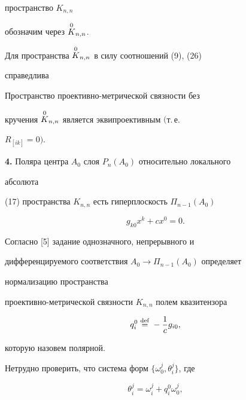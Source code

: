 пространство $K_{n,n}$ 


обозначим через $\overset{0}{K}{}_{n,n}$. 


 


Для пространства $\overset{0}{K}{}_{n,n}$ в силу соотношений (9), (26) 


справедлива 


 


\begin{thm} 


Пространство проективно-метрической связности без 


кручения $\overset{0}{K}{}_{n,n}$ является эквипроективным $($т.\,е. 


$R_{[ik]}=0)$. 


\end{thm} 


 


 


{\bf 4.} Поляра центра $A_0$ слоя $P_n(A_0)$ относительно локального 


абсолюта 


(17) пространства $K_{n,n}$ есть гиперплоскость $\Pi_{n-1}(A_0)$ 


\begin{equation} 


g_{k0}x^k+c x^0=0. 


\end{equation} 


Согласно [5] задание однозначного, непрерывного и 


дифференцируемого соответствия $A_0\to\Pi_{n-1}(A_0)$ определяет 


нормализацию пространства 


проективно-метрической связности $K_{n,n}$ полем квазитензора 


$$ 


q^0_i\defeq-\frac{1}{c}g_{i0}, 


$$ 


которую назовем полярной. 


 


Нетрудно проверить, что система форм $\{\omega^j_0,\theta^j_i\}$, где 


\begin{equation} 


\theta^j_i=\omega^j_i+q^0_i\omega^j_0, 


\end{equation} 


